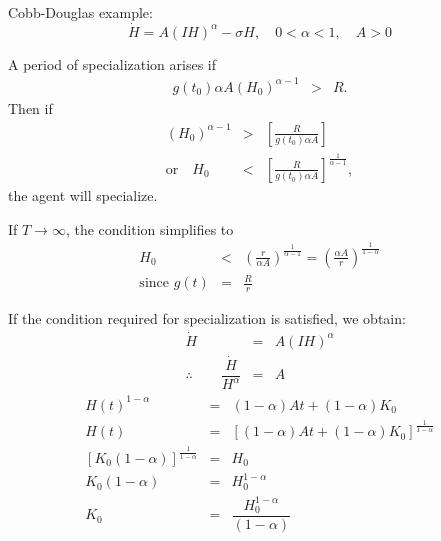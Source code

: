 \documentclass[12pt,compress,handout]{beamer}  %
\begin{document}
\begin{frame}

\footnotesize

Cobb-Douglas example:
\begin{equation*}
    \dot{H} = A(IH)^{\alpha} - \sigma H, \quad 0 < \alpha < 1, \quad A>0
\end{equation*}

A period of specialization arises if
\begin{eqnarray*}
    g(t_0)\alpha A (H_0)^{\alpha - 1} &>& R.
\end{eqnarray*}
Then if
\begin{eqnarray*}
    (H_{0})^{\alpha -1} &>&\left[ \frac{R}{g(t_{0})\alpha A}\right] \\
    \text{or} \quad
    H_{0} &<&\left[ \frac{R}{g(t_{0})\alpha A}\right] ^{\frac{1}{\alpha -1}},
\end{eqnarray*}
the agent will specialize.

If $T \rightarrow \infty$, the condition simplifies to
\begin{eqnarray*}
    H_{0} &<&\left( \frac{r}{\alpha A}\right) ^{\frac{1}{\alpha -1}}=\left(
    \frac{\alpha A}{r}\right) ^{\frac{1}{1-\alpha }} \\
    \text{since }g(t)\text{{}} &=&\text{{}}\frac{R}{r}
\end{eqnarray*}

\end{frame}


\begin{frame}

If the condition required for specialization is satisfied, we
obtain:
\begin{eqnarray*}
    \dot{H}&=&A(IH)^{\alpha}  \\
     \therefore \qquad \dfrac{\dot{H}}{H^{\alpha }}&=&A
\end{eqnarray*}
\begin{eqnarray*}
    H(t)^{1-\alpha} &=& (1-\alpha) At + (1-\alpha) K_{0}\\
    H(t) &=& \left[ (1-\alpha) At +
    (1-\alpha)K_{0}\right]^{\frac{1}{1-\alpha}}\\
    \left[ K_{0} (1-\alpha) \right]^{\frac{1}{1-\alpha}} &=& H_0\\
    K_{0} (1-\alpha) &=& H_0^{1-\alpha} \\
    K_{0} &=& \dfrac{H_0^{1-\alpha}}{(1-\alpha)} \\
\end{eqnarray*}

\end{frame}
\end{document}
